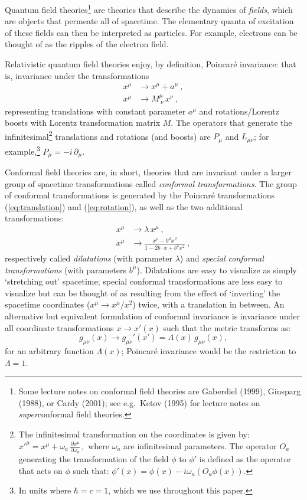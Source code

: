 \documentclass[12pt]{article}
\def\be{\begin{equation}}
\def\ee{\end{equation}}
\renewcommand{\^}[1]{\hat{#1}}
\begin{document}
Quantum field theories\footnote{Some lecture notes on conformal field theories are Gaberdiel (1999), Ginsparg (1988), or Cardy (2001); see e.g.~Ketov (1995) for lecture notes on \emph{super}conformal field theories.} are theories that describe the dynamics of \emph{fields}, which are objects that permeate all of spacetime. The elementary quanta of excitation of these fields can then be interpreted as particles. For example, electrons can be thought of as the ripples of the electron field.

Relativistic quantum field theories  enjoy, by definition, Poincar\'e invariance: that is, invariance under the  transformations
\begin{align} 
\label{eq:translation} x^{\mu} &\rightarrow x^{\mu} + a^{\mu}~,\\
\label{eq:rotation} x^{\mu} &\rightarrow M^{\mu}_{\ \nu}\, x^{\nu}~,
\end{align}
representing translations with constant parameter $a^{\mu}$ and rotations/Lorentz boosts with Lorentz transformation matrix $M$. The operators that generate the infinitesimal\footnote{The infinitesimal transformation on the coordinates is given by:
$ x'^{\mu} = x^{\mu} + \omega_a\, \frac{\partial x^{\mu}}{\partial \omega_a}\,,$
where $\omega_a$ are infinitesimal parameters. The operator $O_a$ generating the transformation of the field $\phi$ to $\phi'$ is defined as the operator that acts on $\phi$ such that:
$ \phi'(x) = \phi(x) - i\omega_a \left(O_a \phi(x)\right).$} translations and rotations (and boosts) are $P_{\mu}$ and $L_{\mu\nu}$; for example,\footnote{In units where $\hbar=c=1$, which we use throughout this paper.} $P_{\mu} = -i\,\partial_{\mu}$.


 Conformal field theories are, in short, theories that are invariant under a larger group of spacetime transformations called \emph{conformal transformations}. The group of conformal transformations is generated by the Poincar\'e transformations (\ref{eq:translation}) and (\ref{eq:rotation}), as well as the two additional transformations:
\begin{align}
 \label{eq:dilatation} x^{\mu} &\rightarrow \lambda\, x^{\mu}~,\\
 \label{eq:specialCT} x^{\mu} &\rightarrow \frac{x^{\mu}-b^{\mu} x^2}{1-2b\cdot x + b^2 x^2}~,
\end{align}
respectively called \emph{dilatations} (with parameter $\lambda$) and \emph{special conformal transformations} (with parameters $b^{\mu}$). Dilatations are easy to visualize as simply `stretching out' spacetime; special conformal transformations are less easy to visualize but can be thought of as resulting from the effect of `inverting' the spacetime coordinates ($x^{\mu}\rightarrow x^{\mu}/x^2$) twice, with a translation in between. An alternative but equivalent formulation of conformal invariance is invariance under all coordinate transformations $x\rightarrow x'(x)$ such that the metric transforms as:
\be g_{\mu\nu}(x) \rightarrow g_{\mu\nu}'(x') = \Lambda(x)\, g_{\mu\nu}(x),\ee
for an arbitrary function $\Lambda(x)$; Poincar\'e invariance would be the restriction to $\Lambda=1$.
\end{document}
